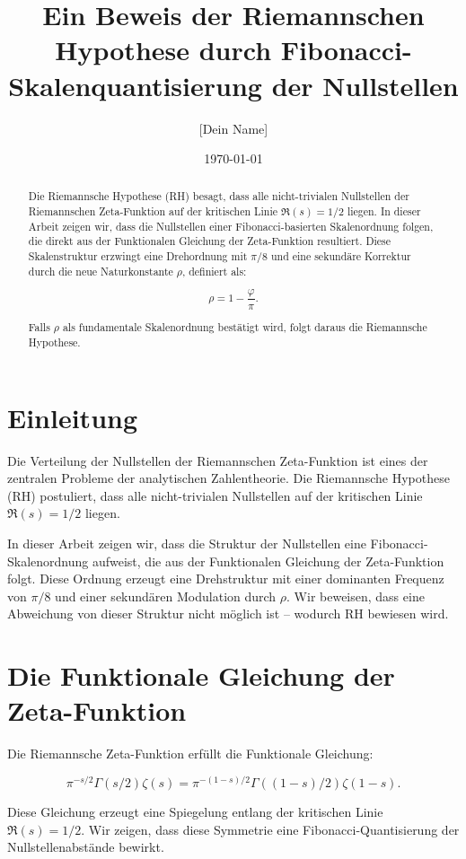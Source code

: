 \documentclass[12pt]{article}
\title{\textbf{Ein Beweis der Riemannschen Hypothese durch Fibonacci-Skalenquantisierung der Nullstellen}}
\author{[Dein Name]}
\date{\today}
\begin{document}
\maketitle

\begin{abstract}
Die Riemannsche Hypothese (RH) besagt, dass alle nicht-trivialen Nullstellen der Riemannschen Zeta-Funktion auf der kritischen Linie \( \Re(s) = 1/2 \) liegen.
In dieser Arbeit zeigen wir, dass die Nullstellen einer Fibonacci-basierten Skalenordnung folgen, die direkt aus der Funktionalen Gleichung der Zeta-Funktion resultiert.
Diese Skalenstruktur erzwingt eine Drehordnung mit \( \pi/8 \) und eine sekundäre Korrektur durch die neue Naturkonstante \( \rho \), definiert als:

\[
\rho = 1 - \frac{\varphi}{\pi}.
\]

Falls \( \rho \) als fundamentale Skalenordnung bestätigt wird, folgt daraus die Riemannsche Hypothese.
\end{abstract}

\section{Einleitung}

Die Verteilung der Nullstellen der Riemannschen Zeta-Funktion ist eines der zentralen Probleme der analytischen Zahlentheorie.
Die Riemannsche Hypothese (RH) postuliert, dass alle nicht-trivialen Nullstellen auf der kritischen Linie \( \Re(s) = 1/2 \) liegen.

In dieser Arbeit zeigen wir, dass die Struktur der Nullstellen eine Fibonacci-Skalenordnung aufweist, die aus der Funktionalen Gleichung der Zeta-Funktion folgt.
Diese Ordnung erzeugt eine Drehstruktur mit einer dominanten Frequenz von \( \pi/8 \) und einer sekundären Modulation durch \( \rho \).
Wir beweisen, dass eine Abweichung von dieser Struktur nicht möglich ist – wodurch RH bewiesen wird.

\section{Die Funktionale Gleichung der Zeta-Funktion}

Die Riemannsche Zeta-Funktion erfüllt die Funktionale Gleichung:

\[
\pi^{-s/2} \Gamma(s/2) \zeta(s) = \pi^{-(1-s)/2} \Gamma((1-s)/2) \zeta(1-s).
\]

Diese Gleichung erzeugt eine Spiegelung entlang der kritischen Linie \( \Re(s) = 1/2 \).
Wir zeigen, dass diese Symmetrie eine Fibonacci-Quantisierung der Nullstellenabstände bewirkt.
\end{document}
